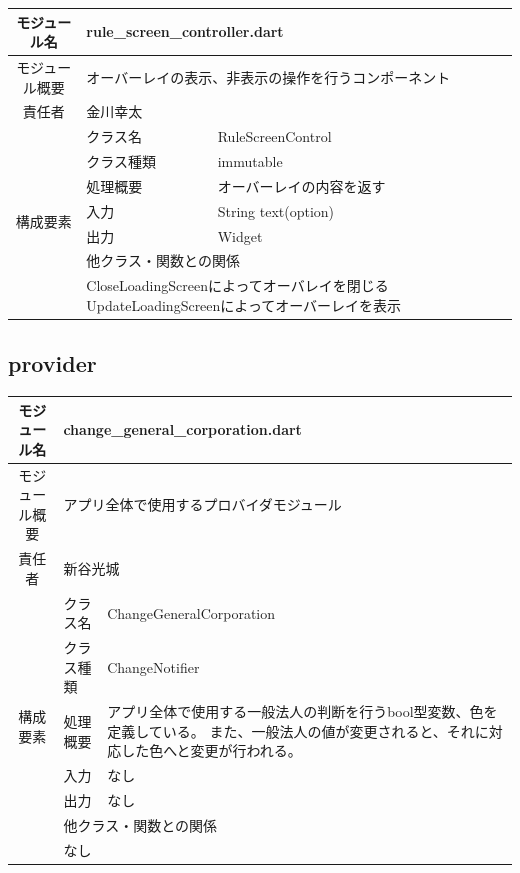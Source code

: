 \begin{table}[H]
  \centering
  \begin{tabular}{|c|l|l|} \hline
    モジュール名 & \multicolumn{2}{l|}{rule\_screen\_controller.dart}  \\ \hline
    モジュール概要 & \multicolumn{2}{p{12cm}|}{オーバーレイの表示、非表示の操作を行うコンポーネント}           \\ \hline
    責任者 & \multicolumn{2}{l|}{金川幸太}           \\ \hline
    \multirow{7}{*}{構成要素}  & クラス名 & RuleScreenControl      \\ \cline{2-3}
      & クラス種類 & immutable \\ \cline{2-3}
      & 処理概要 & オーバーレイの内容を返す \\ \cline{2-3}
      & 入力 & String text(option) \\ \cline{2-3}
      & 出力 & Widget \\ \cline{2-3}
      & \multicolumn{2}{l|}{他クラス・関数との関係}  \\ \cline{2-3}
      & \multicolumn{2}{p{12cm}|}{ CloseLoadingScreenによってオーバレイを閉じる \newline
      UpdateLoadingScreenによってオーバーレイを表示}  \\ \hline
  \end{tabular}
\end{table}
\subsection*{provider}

\begin{table}[H]
  \centering
  \begin{tabular}{|c|l|l|} \hline
    モジュール名 & \multicolumn{2}{l|}{change\_general\_corporation.dart} \\ \hline
    モジュール概要 & \multicolumn{2}{p{12cm}|}{アプリ全体で使用するプロバイダモジュール} \\ \hline
    責任者 & \multicolumn{2}{l|}{新谷光城} \\ \hline
    \multirow{7}{*}{構成要素} & クラス名 & ChangeGeneralCorporation      \\ \cline{2-3}
      & クラス種類 & ChangeNotifier \\ \cline{2-3}
      & 処理概要 & \multicolumn{1}{p{12cm}|}{アプリ全体で使用する一般法人の判断を行うbool型変数、色を定義している。
      また、一般法人の値が変更されると、それに対応した色へと変更が行われる。} \\ \cline{2-3}
      & 入力 & なし \\ \cline{2-3}
      & 出力 & なし \\ \cline{2-3}
      & \multicolumn{2}{l|}{他クラス・関数との関係}  \\ \cline{2-3}
      & \multicolumn{2}{p{12cm}|}{なし}  \\ \hline
  \end{tabular}
\end{table}
